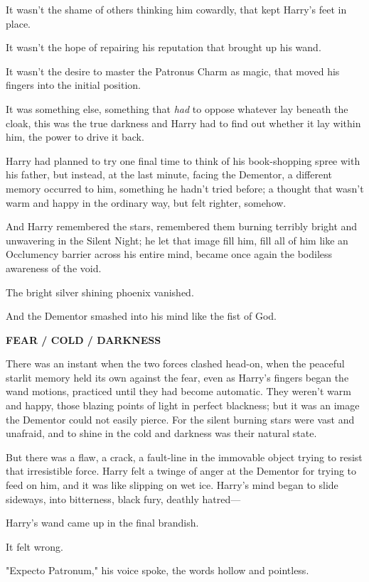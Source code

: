 It wasn't the shame of others thinking him cowardly, that kept Harry's feet in
place.

It wasn't the hope of repairing his reputation that brought up his wand.

It wasn't the desire to master the Patronus Charm as magic, that moved his
fingers into the initial position.

It was something else, something that \emph{had} to oppose whatever lay beneath
the cloak, this was the true darkness and Harry had to find out whether it lay
within him, the power to drive it back.

Harry had planned to try one final time to think of his book-shopping spree
with his father, but instead, at the last minute, facing the Dementor, a
different memory occurred to him, something he hadn't tried before; a thought
that wasn't warm and happy in the ordinary way, but felt righter, somehow.

And Harry remembered the stars, remembered them burning terribly bright and
unwavering in the Silent Night; he let that image fill him, fill all of him
like an Occlumency barrier across his entire mind, became once again the
bodiless awareness of the void.

The bright silver shining phoenix vanished.

And the Dementor smashed into his mind like the fist of God.

\textbf{FEAR / COLD / DARKNESS}

There was an instant when the two forces clashed head-on, when the peaceful
starlit memory held its own against the fear, even as Harry's fingers began the
wand motions, practiced until they had become automatic. They weren't warm and
happy, those blazing points of light in perfect blackness; but it was an image
the Dementor could not easily pierce. For the silent burning stars were vast
and unafraid, and to shine in the cold and darkness was their natural state.

But there was a flaw, a crack, a fault-line in the immovable object trying to
resist that irresistible force. Harry felt a twinge of anger at the Dementor
for trying to feed on him, and it was like slipping on wet ice. Harry's mind
began to slide sideways, into bitterness, black fury, deathly hatred---

Harry's wand came up in the final brandish.

It felt wrong.

"Expecto Patronum," his voice spoke, the words hollow and pointless.

